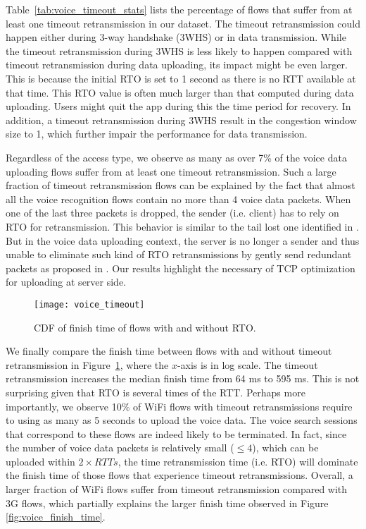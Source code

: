 Table~\ref{tab:voice_timeout_stats} lists the percentage of flows that suffer from at least one timeout retransmission in our dataset. The timeout retransmission could happen either during 3-way handshake (3WHS) or in data transmission. While the timeout retransmission during 3WHS is less likely to happen compared with timeout retransmission during data uploading, its impact might be even larger. This is because the initial RTO is set to 1 second \cite{rfc62982011computing} as there is no RTT available at that time. This RTO value is often much larger than that computed during data uploading. Users might quit the app during this the time period for recovery. In addition, a timeout retransmission during 3WHS result in the congestion window size to 1, which further impair the performance for data transmission.

Regardless of the access type, we observe as many as over 7\% of the voice data uploading flows suffer from at least one timeout retransmission. Such a large fraction of timeout retransmission flows can be explained by the fact that almost all the voice recognition flows contain no more than 4 voice data packets. When one of the last three packets is dropped, the sender (i.e. client) has to rely on RTO for retransmission. This behavior is similar to the tail lost one identified in \cite{flach2013reducing}. But in the voice data uploading context, the server is no longer a sender and thus unable to eliminate such kind of RTO retransmissions by gently send redundant packets as proposed in \cite{flach2013reducing}. Our results highlight the necessary of TCP optimization for uploading at server side. 

\begin{figure}[th]
\centering
	\texttt{[image: voice\_timeout]}
\caption{CDF of finish time of flows with and without RTO.}
\label{fig:voice_rto}
\end{figure}

We finally compare the finish time between flows with and without timeout retransmission in Figure~\ref{fig:voice_rto}, where the $x$-axis is in log scale. The timeout retransmission increases the median finish time from 64 ms to 595 ms.  This is not surprising given that RTO is several times of the RTT. Perhaps more importantly, we observe 10\% of WiFi flows with timeout retransmissions require to using as many as 5 seconds to upload the voice data. The voice search sessions that correspond to these flows are indeed likely to be terminated. In fact, since the number of voice data packets is relatively small ($\le 4$), which can be uploaded within $2\times RTTs$, the time retransmission time (i.e. RTO) will dominate the finish time of those flows that experience timeout retransmissions.  Overall, a larger fraction of WiFi flows suffer from timeout retransmission compared with 3G flows, which partially explains the larger finish time observed in Figure \ref{fig:voice_finish_time}.

